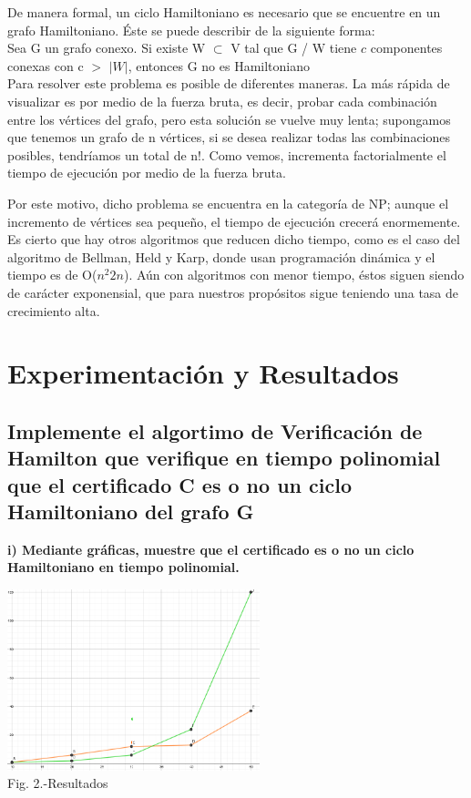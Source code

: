 \documentclass[spanish]{article}
\begin{document}
	De manera formal, un ciclo Hamiltoniano es necesario que se encuentre en un grafo Hamiltoniano. Éste se puede describir de la siguiente forma:\\
	
	Sea G un grafo conexo. Si existe W $\subset$  V tal que G / W tiene $c$ componentes conexas con c $>$ $|W|$, entonces G no es Hamiltoniano\\

	Para resolver este problema es posible de diferentes maneras. La más rápida de visualizar es por medio de la fuerza bruta, es decir, probar cada combinación entre los vértices del grafo, pero esta solución se vuelve muy lenta; supongamos que tenemos un grafo de n vértices, si se desea realizar todas las combinaciones posibles, tendríamos un total de n!. Como vemos, incrementa factorialmente el tiempo de ejecución por medio de la fuerza bruta. \\	
	
	\newpage	

	Por este motivo, dicho problema se encuentra en la categoría de NP; aunque el incremento de vértices sea pequeño, el tiempo de ejecución crecerá enormemente. Es cierto que hay otros algoritmos que reducen  dicho tiempo, como es el caso del algoritmo de Bellman, Held y Karp, donde usan programación dinámica y el tiempo es de O($n^2$$2n$). Aún con algoritmos con menor tiempo, éstos siguen siendo de carácter exponensial, que para nuestros propósitos sigue teniendo una tasa de crecimiento alta.

	\section{Experimentaci\'on y Resultados}
		
	\subsection{Implemente el algortimo de Verificación de Hamilton que verifique en tiempo polinomial que el certificado C  es o no un ciclo Hamiltoniano del grafo G}

	{\large{ {\bf i) Mediante gráficas, muestre que el certificado es o no un ciclo Hamiltoniano en tiempo polinomial.}}}\\

\begin{center}
		\includegraphics[width=0.55\textwidth]{./imagenes/grafica.png}\\
		Fig. 2.-Resultados\\
	\end{center}
\end{document}
